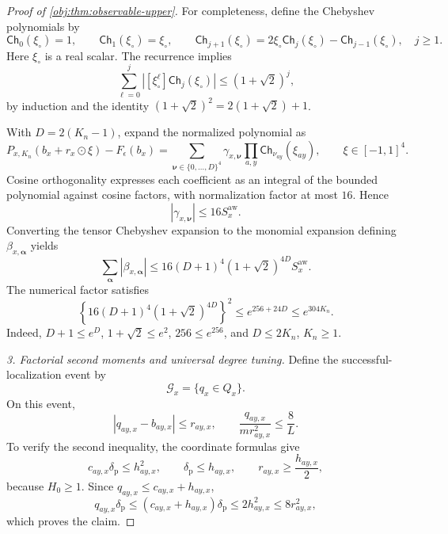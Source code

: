 \begin{proof}[Proof of \cref{obj:thm:observable-upper}]
For completeness, define the Chebyshev polynomials by
\[
\mathsf{Ch}_0(\xi_\circ)=1,\qquad
\mathsf{Ch}_1(\xi_\circ)=\xi_\circ,\qquad
\mathsf{Ch}_{j+1}(\xi_\circ)
=2\xi_\circ\mathsf{Ch}_j(\xi_\circ)-\mathsf{Ch}_{j-1}(\xi_\circ),
\quad j\ge1.
\]
Here \(\xi_\circ\) is a real scalar. The recurrence implies
\[
\sum_{\ell=0}^{j}
\left|[\xi_\circ^\ell]\mathsf{Ch}_j(\xi_\circ)\right|
\le(1+\sqrt2)^j,
\]
by induction and the identity
\((1+\sqrt2)^2=2(1+\sqrt2)+1\).

With \(D=2(K_n-1)\), expand the normalized polynomial as
\[
P_{x,K_n}(b_x+r_x\odot\xi)-F_\epsilon(b_x)
=
\sum_{\boldsymbol\nu\in\{0,\ldots,D\}^4}
\gamma_{x,\boldsymbol\nu}
\prod_{a,y}\mathsf{Ch}_{\nu_{ay}}(\xi_{ay}),
\qquad \xi\in[-1,1]^4.
\]
Cosine orthogonality expresses each coefficient as an integral of the bounded polynomial against cosine factors, with normalization factor at most \(16\). Hence
\[
|\gamma_{x,\boldsymbol\nu}|\le16S_x^{\mathrm{aw}}.
\]
Converting the tensor Chebyshev expansion to the monomial expansion defining \(\beta_{x,\boldsymbol\alpha}\) yields
\[
\sum_{\boldsymbol\alpha}|\beta_{x,\boldsymbol\alpha}|
\le
16(D+1)^4(1+\sqrt2)^{4D}S_x^{\mathrm{aw}}.
\]
The numerical factor satisfies
\[
\left\{16(D+1)^4(1+\sqrt2)^{4D}\right\}^2
\le e^{256+24D}\le e^{304K_n}.
\]
Indeed, \(D+1\le e^D\), \(1+\sqrt2\le e^2\), \(256\le e^{256}\), and \(D\le2K_n\), \(K_n\ge1\).

\textit{3. Factorial second moments and universal degree tuning.}
Define the successful-localization event by
\[
\mathcal G_x=\{q_x\in Q_x\}.
\]
On this event,
\[
|q_{ay,x}-b_{ay,x}|\le r_{ay,x},
\qquad
\frac{q_{ay,x}}{m r_{ay,x}^2}\le\frac8L.
\]
To verify the second inequality, the coordinate formulas give
\[
c_{ay,x}\delta_{\mathrm p}\le h_{ay,x}^2,\qquad
\delta_{\mathrm p}\le h_{ay,x},\qquad
r_{ay,x}\ge\frac{h_{ay,x}}2,
\]
because \(H_0\ge1\). Since \(q_{ay,x}\le c_{ay,x}+h_{ay,x}\),
\[
q_{ay,x}\delta_{\mathrm p}
\le(c_{ay,x}+h_{ay,x})\delta_{\mathrm p}
\le2h_{ay,x}^2
\le8r_{ay,x}^2,
\]
which proves the claim.


\end{proof}
